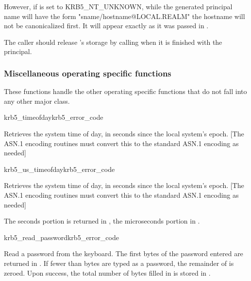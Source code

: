 However, if  is set to KRB5_NT_UNKNOWN,
while the generated principal name will have 	the form
"sname/hostname@LOCAL.REALM" the hostname will not be canonicalized
first.  It will appear exactly as it was passed in .  

The caller should release 's storage by calling
 when it is finished with the principal.



\subsubsection{Miscellaneous operating specific functions}
These functions handle the other operating specific functions that do
not fall into any other major class.

\begin{funcdecl}{krb5_timeofday}{krb5_error_code}{\funcin}
\funcout
{}
\end{funcdecl}

Retrieves the system time of day, in seconds since the local system's
epoch.
[The ASN.1 encoding routines must convert this to the standard ASN.1
encoding as needed]

\begin{funcdecl}{krb5_us_timeofday}{krb5_error_code}{\funcin}
\funcout
{}
\end{funcdecl}

Retrieves the system time of day, in seconds since the local system's
epoch.
[The ASN.1 encoding routines must convert this to the standard ASN.1
encoding as needed]

{\raggedright The seconds portion is returned in , the
microseconds portion in .}

\begin{funcdecl}{krb5_read_password}{krb5_error_code}{\funcin}
\funcout
{}
\funcinout
{}
\end{funcdecl}

Read a password from the keyboard.  The first 
bytes of the password entered are returned in .
If fewer than  bytes are typed as a password,
the remainder of  is zeroed.  Upon success, the
total number of bytes filled in is stored in .

